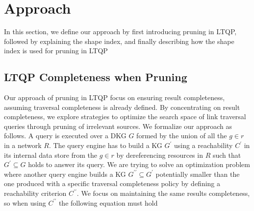 \section{Approach}\label{sec:approach}






In this section, we define our approach by first introducing pruning in LTQP, followed by explaining the shape index, and finally describing how the shape index is used for pruning in LTQP

\subsection{LTQP Completeness when Pruning}\label{sec:slde}

Our approach of pruning in LTQP focus on ensuring result completeness, assuming traversal completeness is already defined.
By concentrating on result completeness, we explore strategies to optimize the search space of link traversal queries through pruning of irrelevant sources.
We formalize our approach as follows.
A query is executed over a DKG $G$ formed by the union of all the $g \in r$ in a network $R$.
The query engine has to build a KG $G^{\prime}$ using a reachability $C^{\prime}$ in its internal data store from the  $g \in r$ by dereferencing resources in $R$ such that
$G^{\prime} \subseteq G$ holds to answer its query.
We are trying to solve an optimization problem where another query engine builds a KG
$G^{\prime\prime} \subseteq G^{\prime}$
potentially smaller than the one produced with a specific traversal completeness policy
by defining a reachability criterion $C^{\prime\prime}$.
We focus on maintaining the same results completeness, so when using $C^{\prime\prime}$ the following equation must hold

